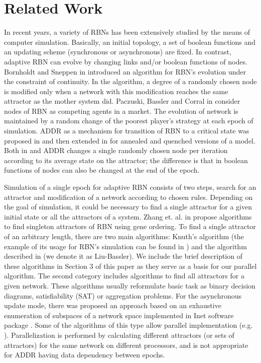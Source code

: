 \documentclass[procedia]{easychair}
\begin{document}
	\section{Related Work}
	\label{sect:related-work}
	In recent years, a variety of RBNs has been extensively studied by the means of computer simulation. Basically, an initial topology, a set of boolean functions and an updating scheme (synchronous or asynchronous) \cite{gershenson04} are fixed. In contrast, adaptive RBN can evolve by changing links and/or boolean functions of nodes. Bornholdt and Sneppen in \cite{bornholdt1998neutral} introduced an algorithm for RBN's evolution under the constraint of continuity. In the algorithm, a degree of a randomly chosen node is modified only when a network with this modification reaches the same attractor as the mother system did. Paczuski, Bassler and Corral in \cite{paczuski2000self} consider nodes of RBN as competing agents in a market. The evolution of network is maintained by a random change of the poorest player's strategy at each epoch of simulation. ADDR as a mechanism for transition of RBN to a critical state was proposed in \cite{bornholdt2000topological} and then extended in \cite{mlb} for annealed and quenched versions of a model. Both in  \cite{bornholdt2000topological} and \cite{mlb} ADDR changes a single randomly chosen node per iteration according to its average state on the attractor; the difference is that in \cite{mlb} boolean functions of nodes can also be changed at the end of the epoch. 
	
	Simulation of a single epoch for adaptive RBN consists of two steps, search for an attractor and modification of a network according to chosen rules. Depending on the goal of simulation, it could be necessary to find a single attractor for a given initial state or all the attractors of a system. Zhang et. al. in \cite{zhang2007algorithms} propose algorithms to find singleton attractors of RBN using gene ordering. To find a single attractor of an arbitrary length, there are two main algorithms: Knuth's algorithm \cite{knuth1981art} (the example of its usage for RBN's simulation can be found in \cite{bhattacharjya1996median}) and the algorithm described in \cite{mlb} (we denote it as Liu-Bassler). We include the brief description of these algorithms in Section 3 of this paper as they serve as a basis for our parallel algorithm. The second category includes algorithms to find all attractors for a given network. These algorithms usually reformulate basic task as binary decision diagrams, satisfiability (SAT) or aggregation problems. For the asynchronous update mode, there was proposed an approach based on an exhaustive enumeration of subspaces of a network space implemented in Inet software package \cite{berntenis2013detection}. Some of the algorithms of this type allow parallel implementation (e.g. \cite{guo2014parallel}). Parallelization is performed by calculating different attractors (or sets of attractors) for the same network on different processors, and is not appropriate for ADDR having data dependency between epochs. 
	
\end{document}
